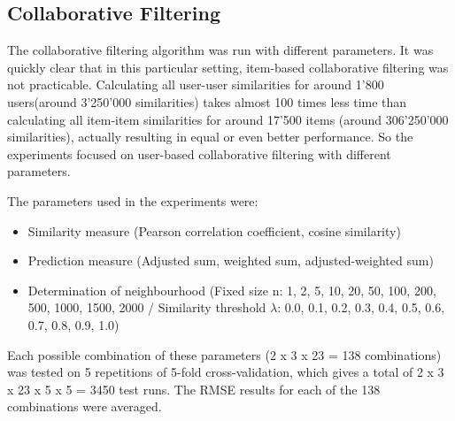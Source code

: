 \subsection{Collaborative Filtering}
\label{sst:cf} The collaborative filtering algorithm was run with different parameters. It was quickly clear that in this particular setting, item-based collaborative filtering was not practicable. Calculating all user-user similarities for around 1'800 users(around 3'250'000 similarities) takes almost 100 times less time than calculating all item-item similarities for around 17'500 items (around 306'250'000 similarities), actually resulting in equal or even better performance. So the experiments focused on user-based collaborative filtering with different parameters.

The parameters used in the experiments were:

\begin{itemize}
\item Similarity measure (Pearson correlation coefficient, cosine similarity)
\item Prediction measure (Adjusted sum, weighted sum, adjusted-weighted sum)
\item Determination of neighbourhood (Fixed size n: 1, 2, 5, 10, 20, 50, 100, 200, 500, 1000, 1500, 2000 / Similarity threshold $\lambda$: 0.0, 0.1, 0.2, 0.3, 0.4, 0.5, 0.6, 0.7, 0.8, 0.9, 1.0)
\end{itemize}

Each possible combination of these parameters (2 x 3 x 23 = 138 combinations) was tested on 5 repetitions of 5-fold cross-validation, which gives a total of 2 x 3 x 23 x 5 x 5 = 3450 test runs. The RMSE results for each of the 138 combinations were averaged.